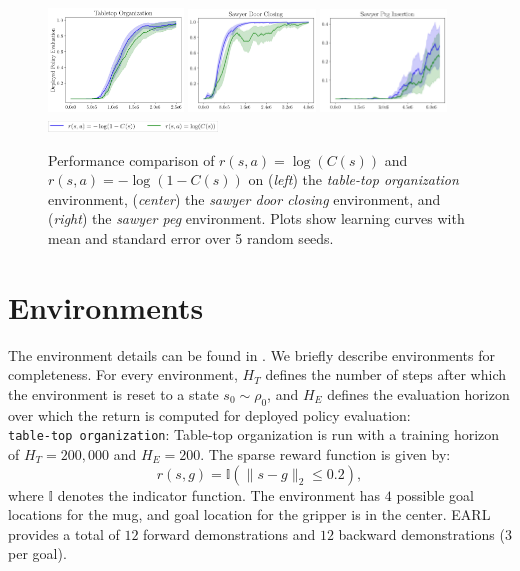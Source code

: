 \documentclass[nohyperref]{article}
\theoremstyle{plain}
\theoremstyle{definition}
\theoremstyle{remark}
\begin{document}
\begin{figure}[t]
    \centering
    \includegraphics[width=0.32\textwidth]{figures/tabletop_compare_transfer.png}
    \includegraphics[width=0.3\textwidth]{figures/door_compare_transfer.png}
    \includegraphics[width=0.3\textwidth]{figures/peg_compare_transfer.png}
    \includegraphics[width=0.4\textwidth]{figures/legend2.png}
    
    \caption{Performance comparison of $r(s, a) = \log(C(s))$ and  $r(s, a) = -\log(1-C(s))$ on (\textit{left}) the \textit{table-top organization} environment, (\textit{center}) the \textit{sawyer door closing} environment, and (\textit{right}) the \textit{sawyer peg} environment. Plots show learning curves with mean and standard error over 5 random seeds.}
    \label{fig:appendix_comparison}
\end{figure}

\section{Environments}
\label{sec:append_environment}
The environment details can be found in \citep{sharma2021autonomous}. We briefly describe environments for completeness. For every environment, $H_T$ defines the number of steps after which the environment is reset to a state $s_0 \sim \rho_0$, and $H_E$ defines the evaluation horizon over which the return is computed for deployed policy evaluation: \\
\texttt{table-top organization}:
Table-top organization is run with a training horizon of $H_T = 200,000$ and $H_E = 200$. The sparse reward function is given by:
$$ r(s, g) = \mathbb{I}(\lVert s - g \rVert_2 \leq 0.2),$$
where $\mathbb{I}$ denotes the indicator function. The environment has $4$ possible goal locations for the mug, and goal location for the gripper is in the center. EARL provides a total of $12$ forward demonstrations and $12$ backward demonstrations ($3$ per goal).
\end{document}
